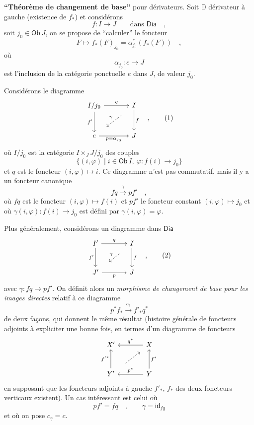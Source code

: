 \documentclass[11pt]{article}
\newcommand{\printedpage}[1]{\marginpar{\footnotesize p.~#1}}
\newcommand{\msp}[1]{\marginpar{\footnotesize [#1]}}
\newcommand{\sDia}{\mathsf{Dia}}
\newcommand{\sOb}{\mathsf{Ob}}
\newcommand{\sid}{\mathsf{id}}
\newcommand{\DD}{\mathbb{D}}
\begin{document}
\textbf{“Théorème de changement de base”} pour dérivateurs. Soit $\DD$ dérivateur à gauche (existence de $f_*$) et considérons
\[ f : I \longrightarrow J \qquad \text{dans } \sDia \quad , \]
soit $j_0 \in \sOb\ J$, on se propose de “calculer” le foncteur
\[ F \mapsto f_*(F)_{j_0} = \alpha^*_{j_0}(f_*(F)) \quad , \]
où
\[ \alpha_{j_0} : e \longrightarrow J \]
est l'inclusion de la catégorie ponctuelle $e$ dans $J$, de valeur $j_0$.

\msp{page 30}
Considérons le diagramme
\[
\begin{tikzcd}[row sep=large, column sep=large]
I/j_0 \arrow[r, "q"] \arrow[d, "f'"'] & I \arrow[d, "f"] \\
e \arrow[r, "p = \alpha_{j_0}"'] & J
\arrow[from=1-2, to=2-1, dashed, shorten <=14pt, shorten >=14pt, "\gamma"']
\end{tikzcd}
\quad ,
\tag*{(1)}
\]
où $I/j_0$ est la catégorie $I \times_J J/j_0$ des couples
\[ \{(i,\varphi) \mid i \in \sOb\ I,\ \varphi : f(i) \to j_0\} \]
et $q$ est le foncteur $(i,\varphi) \mapsto i$. Ce diagramme n'est pas commutatif, mais il y a un foncteur canonique
\[ fq \xrightarrow{\gamma} pf' \quad , \]
où $fq$ est le foncteur $(i,\varphi) \mapsto f(i)$ et $pf'$ le foncteur constant $(i,\varphi) \mapsto j_0$ et où $\gamma(i,\varphi) : f(i) \to j_0$ est défini par $\gamma(i,\varphi) = \varphi$.

Plus généralement, considérons un diagramme dans $\sDia$
\[
\begin{tikzcd}[row sep=large, column sep=large]
I' \arrow[r, "q"] \arrow[d, "f'"'] & I \arrow[d, "f"] \\
J' \arrow[r, "p"'] & J
\arrow[from=1-2, to=2-1, dashed, shorten <=14pt, shorten >=14pt, "\gamma"']
\end{tikzcd}
\quad ,
\tag*{(2)}
\]
\printedpage{21}
avec $\gamma : fq \to pf'$. On définit alors un \textit{morphisme de changement de base pour les images directes} relatif à ce diagramme
\[ p^* f_* \xrightarrow{c_\gamma} f'_* q^* \]
\msp{page 31}
de deux façons, qui donnent le même résultat (histoire générale de foncteurs adjoints à expliciter une bonne fois, en termes d'un diagramme de foncteurs
\[
\begin{tikzcd}[row sep=large, column sep=large]
X' & X \arrow[l, "q^*"'] \\
Y' \arrow[u, "{f'}^*"] & Y \arrow[l, "p^*"'] \arrow[u, "f^*"']
\arrow[from=2-1, to=1-2, dashed, shorten <=14pt, shorten >=6pt]
\end{tikzcd}
\]
en supposant que les foncteurs adjoints à gauche $f'_*$, $f_*$ des deux foncteurs verticaux existent). Un cas intéressant est celui où
\[ pf' = fq \quad , \qquad \gamma = \sid_{fq} \]
et où on pose $c_\gamma = c$.
\end{document}

